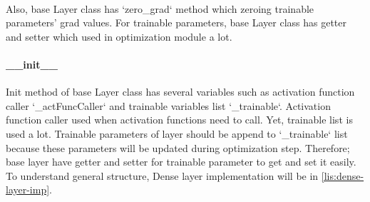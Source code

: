 \documentclass[12pt]{report}
\begin{document}
\paragraph{}
Also, base Layer class has `zero\_grad` method which zeroing trainable parameters' grad values. For trainable parameters, base Layer class has getter and setter which used in optimization module a lot.

\paragraph{\_\_init\_\_}
Init method of base Layer class has several variables such as activation function caller `\_actFuncCaller` and trainable variables list `\_trainable`. Activation function caller used when activation functions need to call. Yet, trainable list is used a lot. Trainable parameters of layer should be append to `\_trainable` list because these parameters will be updated during optimization step. Therefore; base layer have getter and setter for trainable parameter to get and set it easily. To understand general structure, Dense layer implementation will be in \ref{lis:dense-layer-imp}.
\end{document}
